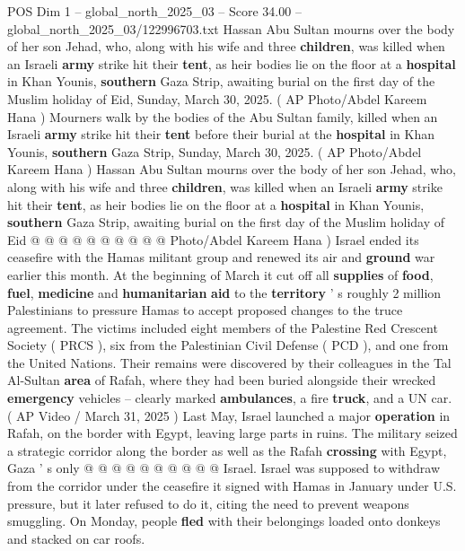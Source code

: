 \begin{textsample}{POS Dim 1 – global\_north\_2025\_03 – Score 34.00 – global\_north\_2025\_03/122996703.txt}  \label{ex:f1_pos_392}
Hassan Abu Sultan mourns over the body of her son Jehad, who, along with his wife and three \textbf{children}, was killed when an Israeli \textbf{army} strike hit their \textbf{tent}, as heir bodies lie on the floor at a \textbf{hospital} in Khan Younis, \textbf{southern} Gaza Strip, awaiting burial on the first day of the Muslim holiday of Eid, Sunday, March 30, 2025. ( AP Photo/Abdel Kareem Hana ) Mourners walk by the bodies of the Abu Sultan family, killed when an Israeli \textbf{army} strike hit their \textbf{tent} before their burial at the \textbf{hospital} in Khan Younis, \textbf{southern} Gaza Strip, Sunday, March 30, 2025. ( AP Photo/Abdel Kareem Hana ) Hassan Abu Sultan mourns over the body of her son Jehad, who, along with his wife and three \textbf{children}, was killed when an Israeli \textbf{army} strike hit their \textbf{tent}, as heir bodies lie on the floor at a \textbf{hospital} in Khan Younis, \textbf{southern} Gaza Strip, awaiting burial on the first day of the Muslim holiday of Eid @ @ @ @ @ @ @ @ @ @ Photo/Abdel Kareem Hana ) Israel ended its ceasefire with the Hamas militant group and renewed its air and \textbf{ground} war earlier this month.
At the beginning of March it cut off all \textbf{supplies} of \textbf{food}, \textbf{fuel}, \textbf{medicine} and \textbf{humanitarian} \textbf{aid} to the \textbf{territory} ' s roughly 2 million Palestinians to pressure Hamas to accept proposed changes to the truce agreement.
The victims included eight members of the Palestine Red Crescent Society ( PRCS ), six from the Palestinian Civil Defense ( PCD ), and one from the United Nations.
Their remains were discovered by their colleagues in the Tal Al-Sultan \textbf{area} of Rafah, where they had been buried alongside their wrecked \textbf{emergency} vehicles -- clearly marked \textbf{ambulances}, a fire \textbf{truck}, and a UN car. ( AP Video / March 31, 2025 ) Last May, Israel launched a major \textbf{operation} in Rafah, on the border with Egypt, leaving large parts in ruins.
The military seized a strategic corridor along the border as well as the Rafah \textbf{crossing} with Egypt, Gaza ' s only @ @ @ @ @ @ @ @ @ @ Israel.
Israel was supposed to withdraw from the corridor under the ceasefire it signed with Hamas in January under U.S. pressure, but it later refused to do it, citing the need to prevent weapons smuggling.
On Monday, people \textbf{fled} with their belongings loaded onto donkeys and stacked on car roofs.

\end{textsample}

